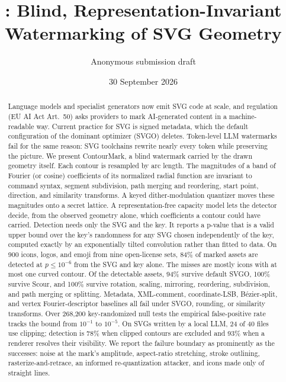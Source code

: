 \documentclass[10pt,twocolumn]{article}
\title{\system: Blind, Representation-Invariant Watermarking of SVG Geometry}
\author{Anonymous submission draft}
\date{30 September 2026}
\newcommand{\system}{ContourMark}
\begin{document}
\maketitle

\begin{abstract}
Language models and specialist generators now emit SVG code at scale, and regulation (EU AI Act Art.~50) asks providers to mark AI-generated content in a machine-readable way. Current practice for SVG is signed metadata, which the default configuration of the dominant optimizer (SVGO) deletes. Token-level LLM watermarks fail for the same reason: SVG toolchains rewrite nearly every token while preserving the picture. We present \system{}, a blind watermark carried by the drawn geometry itself. Each contour is resampled by arc length. The magnitudes of a band of Fourier (or cosine) coefficients of its normalized radial function are invariant to command syntax, segment subdivision, path merging and reordering, start point, direction, and similarity transforms. A keyed dither-modulation quantizer moves these magnitudes onto a secret lattice. A representation-free capacity model lets the detector decide, from the observed geometry alone, which coefficients a contour could have carried. Detection needs only the SVG and the key. It reports a p-value that is a valid upper bound over the key's randomness for any SVG chosen independently of the key, computed exactly by an exponentially tilted convolution rather than fitted to data. On 900 icons, logos, and emoji from nine open-license sets, 84\% of marked assets are detected at $p\le10^{-6}$ from the SVG and key alone. The misses are mostly icons with at most one curved contour. Of the detectable assets, 94\% survive default SVGO, 100\% survive Scour, and 100\% survive rotation, scaling, mirroring, reordering, subdivision, and path merging or splitting. Metadata, XML-comment, coordinate-LSB, Bézier-split, and vertex Fourier-descriptor baselines all fail under SVGO, rounding, or similarity transforms. Over 268{,}200 key-randomized null tests the empirical false-positive rate tracks the bound from $10^{-1}$ to $10^{-5}$. On SVGs written by a local LLM, 24 of 40 files use clipping; detection is 78\% when clipped contours are excluded and 93\% when a renderer resolves their visibility. We report the failure boundary as prominently as the successes: noise at the mark's amplitude, aspect-ratio stretching, stroke outlining, rasterize-and-retrace, an informed re-quantization attacker, and icons made only of straight lines.
\end{abstract}
\end{document}
